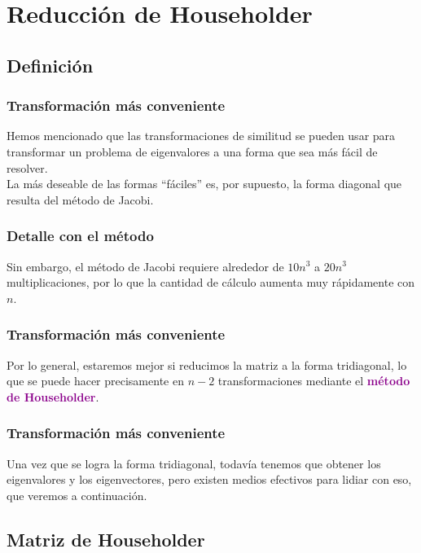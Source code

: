 \documentclass[12pt]{beamer}
\begin{document}
\section{Reducción de Householder}
\subsection{Definición}

\begin{frame}
\frametitle{Transformación más conveniente}
Hemos mencionado que las transformaciones de similitud se pueden usar para transformar un problema de eigenvalores a una forma que sea más fácil de resolver.
\\
\bigskip
\pause
La más deseable de las formas \enquote{fáciles} es, por supuesto, la forma diagonal que resulta del método de Jacobi.
\end{frame}
\begin{frame}
\frametitle{Detalle con el método}
Sin embargo, el método de Jacobi requiere alrededor de $10 n^{3}$ a $20 n^{3}$ multiplicaciones, por lo que la cantidad de cálculo aumenta muy rápidamente con $n$.
\end{frame}
\begin{frame}
\frametitle{Transformación más conveniente}
Por lo general, estaremos mejor si reducimos la matriz a la forma tridiagonal, \pause lo que se puede hacer precisamente en $n - 2$ transformaciones mediante el \textbf{\textcolor{darkmagenta}{método de Householder}}.
\end{frame}
\begin{frame}
\frametitle{Transformación más conveniente}
Una vez que se logra la forma tridiagonal, todavía tenemos que obtener los eigenvalores y los eigenvectores, pero existen medios efectivos para lidiar con eso, que veremos a continuación.
\end{frame}

\subsection{Matriz de Householder}
\end{document}

